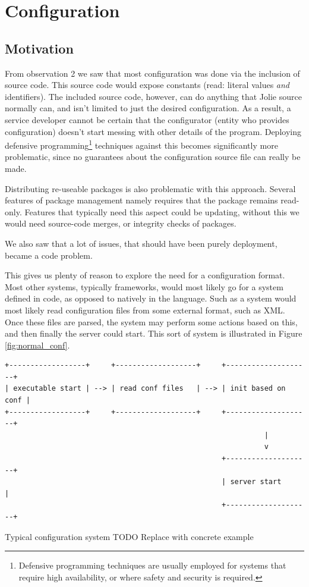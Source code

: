 \section{Configuration}

\subsection{Motivation}

From observation 2 we saw that most configuration was done via the inclusion of
source code. This source code would expose constants (read: literal values
\emph{and} identifiers). The included source code, however, can do anything
that Jolie source normally can, and isn't limited to just the desired
configuration. As a result, a service developer cannot be certain that the
configurator (entity who provides configuration) doesn't start messing with
other details of the program. Deploying defensive
programming\footnote{Defensive programming techniques are usually employed for
systems that require high availability, or where safety and security is
required.} techniques against this becomes significantly more problematic,
since no guarantees about the configuration source file can really be made.

Distributing re-useable packages is also problematic with this approach.
Several features of package management namely requires that the package remains
read-only. Features that typically need this aspect could be updating, without
this we would need source-code merges, or integrity checks of packages.

We also saw that a lot of issues, that should have been purely deployment,
became a code problem.

This gives us plenty of reason to explore the need for a configuration format.
Most other systems, typically frameworks, would most likely go for a system
defined in code, as opposed to natively in the language. Such as a system would
most likely read configuration files from some external format, such as XML.
Once these files are parsed, the system may perform some actions based on this,
and then finally the server could start. This sort of system is illustrated in
Figure \ref{fig:normal_conf}.

\begin{listing}[H]
\begin{verbatim}
+------------------+     +-------------------+     +--------------------+
| executable start | --> | read conf files   | --> | init based on conf |
+------------------+     +-------------------+     +--------------------+
                                                             |
                                                             v
                                                   +--------------------+
                                                   | server start       |
                                                   +--------------------+
\end{verbatim}
\caption{Typical configuration system TODO Replace with concrete example}
\label{fig:normal_conf}
\end{listing}

